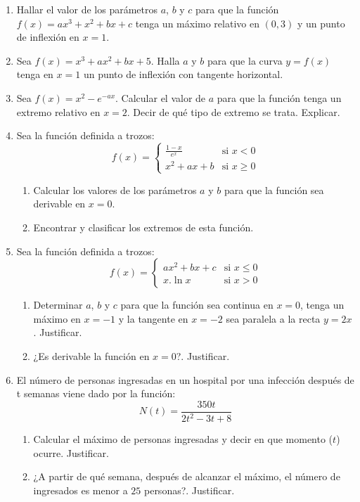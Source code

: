 \documentclass[12pt]{article}
\theoremstyle{definition}
\begin{document}
\begin{enumerate}

\item  
Hallar el valor de los parámetros $a$, $b$ y $c$ para que la función $f(x) = ax^3+x^2+bx+c$ tenga un máximo relativo en $(0,3)$ y un punto de inflexión en $x=1$.

\item  
Sea $f(x)= x^3 + ax^2+bx+5$. Halla $a$ y $b$ para que la curva $y=f(x)$ tenga en $x=1$ un punto de inflexión con tangente horizontal.

\item  
Sea $f(x) = x^2-e^{-ax}$. Calcular el valor de $a$ para que la función tenga un extremo relativo en $x = 2$. Decir de qué tipo de extremo se trata. Explicar.

\item  
Sea la función definida a trozos:
\begin{equation*}
f(x) = 
\begin{cases} 
\frac{1-x}{e^x}& \text{si  } x < 0 \\
 x^2+ax+b& \text{si  } x \geq 0
\end{cases} 
\end{equation*}
\begin{enumerate}
\item Calcular los valores de los parámetros $a$ y $b$ para que la función sea derivable en $x=0$.
\item Encontrar y clasificar los extremos de esta función.
\end{enumerate}

\item  
Sea la función definida a trozos:
\begin{equation*}
f(x) = 
\begin{cases} 
a x^2+bx+ c& \text{si  } x \leq 0 \\
x.\ln{x}& \text{si  } x > 0
\end{cases} 
\end{equation*}
\begin{enumerate}
\item Determinar $a$, $b$ y $c$ para que la función sea continua en $x = 0$, tenga un máximo en $x = -1$ y la tangente en $x = -2$ sea paralela a la recta $y = 2x$. Justificar.
\item ¿Es derivable la función en $x = 0$?. Justificar.
\end{enumerate}

\item  
El número de personas ingresadas en un hospital por una infección después de t semanas viene dado por la función:
\begin{equation*}
N(t) = \frac{350t}{2t^2-3t+8}
\end{equation*}
\begin{enumerate}
\item Calcular el máximo de personas ingresadas y decir en que momento ($t$) ocurre. Justificar.
\item ¿A partir de qué semana, después de alcanzar el máximo, el número de ingresados es menor a $25$ personas?. Justificar.
\end{enumerate}
 

\end{enumerate}
\end{document}
